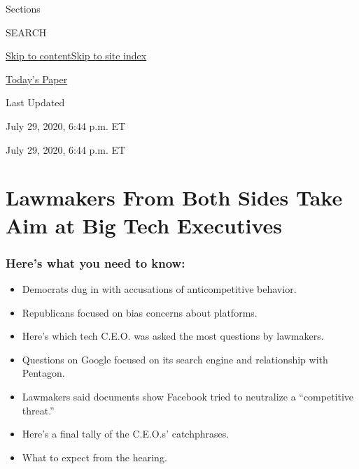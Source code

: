 Sections

SEARCH

\protect\hyperlink{site-content}{Skip to
content}\protect\hyperlink{site-index}{Skip to site index}

\href{https://myaccount.nytimes3xbfgragh.onion/auth/login?response_type=cookie\&client_id=vi}{}

\href{https://www.nytimes3xbfgragh.onion/section/todayspaper}{Today's
Paper}

Last Updated

July 29, 2020, 6:44 p.m. ET

July 29, 2020, 6:44 p.m. ET

\hypertarget{lawmakers-from-both-sides-take-aim-at-big-tech-executives}{%
\section{Lawmakers From Both Sides Take Aim at Big Tech
Executives}\label{lawmakers-from-both-sides-take-aim-at-big-tech-executives}}

\hypertarget{heres-what-you-need-to-know}{%
\subsubsection{Here's what you need to
know:}\label{heres-what-you-need-to-know}}

\begin{itemize}
\item
  \protect\hyperlink{democrats-dug-in-with-accusations-of-anticompetitive-behavior}{}

  Democrats dug in with accusations of anticompetitive behavior.
\item
  \protect\hyperlink{republicans-focused-on-bias-concerns-about-platforms}{}

  Republicans focused on bias concerns about platforms.
\item
  \protect\hyperlink{heres-which-tech-ceo-was-asked-the-most-questions-by-lawmakers}{}

  Here's which tech C.E.O. was asked the most questions by lawmakers.
\item
  \protect\hyperlink{questions-on-google-focused-on-its-search-engine-and-relationship-with-pentagon}{}

  Questions on Google focused on its search engine and relationship with
  Pentagon.
\item
  \protect\hyperlink{lawmakers-said-documents-show-facebook-tried-to-neutralize-a-competitive-threat}{}

  Lawmakers said documents show Facebook tried to neutralize a
  ``competitive threat.''
\item
  \protect\hyperlink{what-ceos-said}{}

  Here's a final tally of the C.E.O.s' catchphrases.
\item
  \protect\hyperlink{what-to-expect-from-the-hearing}{}

  What to expect from the hearing.
\end{itemize}

